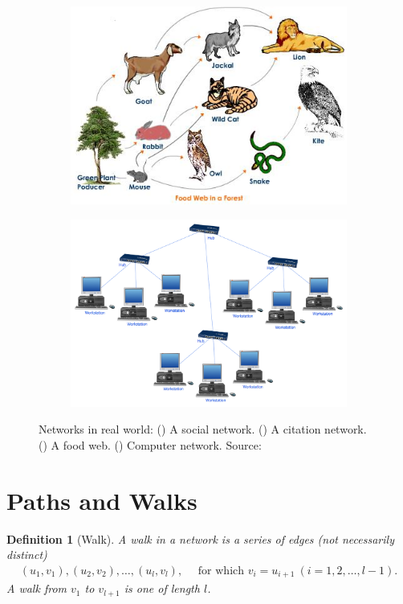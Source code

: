 \documentclass[10pt,a4paper]{article}
\newtheorem{defn}{Definition}
\begin{document}
\begin{figure}[H]
		\begin{subfigure}[b]{0.4\textwidth}
			\includegraphics[width=\textwidth]{images/foodweb.jpeg}
			\caption{}
			\label{foodweb}
		\end{subfigure}
		\quad 
		\begin{subfigure}[b]{0.4\textwidth}
			\includegraphics[width=\textwidth]{images/computer-2.png}
			\caption{}
			\label{internet}
		\end{subfigure}
		\caption{Networks in real world: () A social network. () A citation network. () A food web.  () Computer network. Source: \citep{googleimages}}
	\end{figure} 

\section{Paths and Walks}
\begin{defn}[Walk]
	A walk in a network is a series of edges (not necessarily distinct)
	\begin{eqnarray*}
		(u_1,v_1),(u_2,v_2),\ldots,(u_l,v_l), \quad \text{ for which }  v_i=u_{i+1} ~(i=1,2,\ldots,l-1).
	\end{eqnarray*}
	A walk from $v_1 $ to $v_{l+1}$ is one of length $l$.   \citep{estrada2015first}
\end{defn}
\end{document}

